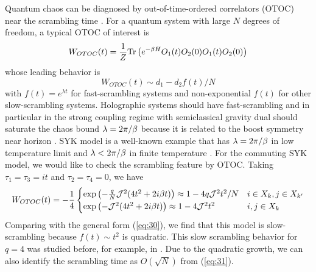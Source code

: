 \documentclass[11pt]{article}
\renewcommand{\>}{\rangle}
\newcommand{\<}{\langle}
\begin{document}
Quantum chaos can be diagnosed by out-of-time-ordered correlators
(OTOC) near the scrambling time \cite{Shenker:2013pqa, kitaev2014hidden, Roberts:2014ifa}. For a quantum system with large $N$ degrees of freedom, a typical OTOC of interest
is 
\begin{equation}
W_{OTOC}(t)=\frac{1}{Z}\text{Tr}\left(e^{-\beta H}O_{1}(t)O_{2}(0)O_{1}(t)O_{2}(0)\right)\label{eq:29}
\end{equation}
whose leading behavior is
\begin{equation}
W_{OTOC}(t)\sim d_{1}-d_{2}f(t)/N\label{eq:30}
\end{equation}
with $f(t)=e^{\lambda t}$ for fast-scrambling systems \cite{Shenker:2013pqa, kitaev2014hidden, Roberts:2014ifa,Shenker:2013yza,Shenker:2014cwa,Maldacena:2016hyu} and
non-exponential $f(t)$ for other slow-scrambling systems.
Holographic systems should have fast-scrambling and in particular
in the strong coupling regime with semiclassical gravity dual should saturate
the chaos bound $\lambda=2\pi/\beta$ \cite{Maldacena:2015waa} because it is related
to the boost symmetry near horizon \cite{Shenker:2013pqa}. SYK model is a well-known
example that has $\lambda=2\pi/\beta$ in low temperature limit and $\lambda<2\pi/\beta$
in finite temperature \cite{Maldacena:2016hyu}. For the commuting SYK model, we would
like to check the scrambling feature by OTOC. Taking $\tau_{1}=\tau_{3}=it$
and $\tau_{2}=\tau_{4}=0$, we have
\begin{equation}
W_{OTOC}(t)=-\frac{1}{4}\begin{cases}
\exp\left(-\frac{q}{N}\mathcal{J}^{2}(4t^{2}+2i\beta t)\right)\approx1-4q\mathcal{J}^{2}t^{2}/N & i\in X_{k},j\in X_{k'}\\
\exp\left(-\mathcal{J}^{2}(4t^{2}+2i\beta t)\right)\approx1-4\mathcal{J}^{2}t^{2} & i,j\in X_{k}
\end{cases}\label{eq:31}
\end{equation}
Comparing with the general form (\ref{eq:30}), we find that this
model is slow-scrambling because $f(t)\sim t^{2}$ is quadratic. This slow scrambling behavior for $q=4$  was studied before, for example, in \cite{Swingle:2016jdj}. Due
to the quadratic growth, we can also identify the scrambling time
as $O(\sqrt{N})$ from (\ref{eq:31}). 
\end{document}
